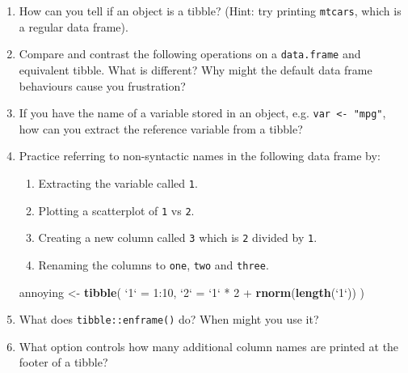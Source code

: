 \documentclass[]{book}
\newenvironment{Shaded}{\begin{snugshade}}{\end{snugshade}}
\newcommand{\KeywordTok}[1]{\textcolor[rgb]{0.13,0.29,0.53}{\textbf{{#1}}}}
\newcommand{\DataTypeTok}[1]{\textcolor[rgb]{0.13,0.29,0.53}{{#1}}}
\newcommand{\DecValTok}[1]{\textcolor[rgb]{0.00,0.00,0.81}{{#1}}}
\newcommand{\StringTok}[1]{\textcolor[rgb]{0.31,0.60,0.02}{{#1}}}
\newcommand{\NormalTok}[1]{{#1}}
\begin{document}
\begin{enumerate}
\def\labelenumi{\arabic{enumi}.}
\item
  How can you tell if an object is a tibble? (Hint: try printing
  \texttt{mtcars}, which is a regular data frame).
\item
  Compare and contrast the following operations on a \texttt{data.frame}
  and equivalent tibble. What is different? Why might the default data
  frame behaviours cause you frustration?

\begin{Shaded}
\end{Shaded}
\item
  If you have the name of a variable stored in an object, e.g.
  \texttt{var\ \textless{}-\ "mpg"}, how can you extract the reference
  variable from a tibble?
\item
  Practice referring to non-syntactic names in the following data frame
  by:

  \begin{enumerate}
  \def\labelenumii{\arabic{enumii}.}
  \item
    Extracting the variable called \texttt{1}.
  \item
    Plotting a scatterplot of \texttt{1} vs \texttt{2}.
  \item
    Creating a new column called \texttt{3} which is \texttt{2} divided
    by \texttt{1}.
  \item
    Renaming the columns to \texttt{one}, \texttt{two} and
    \texttt{three}.
  \end{enumerate}

\begin{Shaded}
\begin{Highlighting}[]
\NormalTok{annoying <-}\StringTok{ }\KeywordTok{tibble}\NormalTok{(}
  \StringTok{`}\DataTypeTok{1}\StringTok{`} \NormalTok{=}\StringTok{ }\DecValTok{1}\NormalTok{:}\DecValTok{10}\NormalTok{,}
  \StringTok{`}\DataTypeTok{2}\StringTok{`} \NormalTok{=}\StringTok{ `}\DataTypeTok{1}\StringTok{`} \NormalTok{*}\StringTok{ }\DecValTok{2} \NormalTok{+}\StringTok{ }\KeywordTok{rnorm}\NormalTok{(}\KeywordTok{length}\NormalTok{(}\StringTok{`}\DataTypeTok{1}\StringTok{`}\NormalTok{))}
\NormalTok{)}
\end{Highlighting}
\end{Shaded}
\item
  What does \texttt{tibble::enframe()} do? When might you use it?
\item
  What option controls how many additional column names are printed at
  the footer of a tibble?
\end{enumerate}
\end{document}
